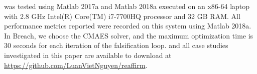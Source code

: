 \toolreaffirm was tested using Matlab 2017a and Matlab 2018a executed on an x86-64 laptop with 2.8 GHz Intel(R) Core(TM) i7-7700HQ processor and 32 GB RAM. All performance metrics reported were recorded on this system using Matlab 2018a. In Breach, we choose the CMAES solver, and the maximum optimization time is 30 seconds for each iteration of the falsification loop. \toolreaffirm and all case studies investigated in this paper are available to download at \url{https://github.com/LuanVietNguyen/reaffirm}.

% 
%
